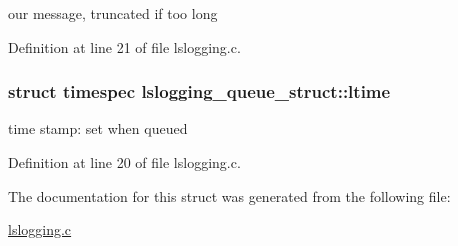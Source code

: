 our message, truncated if too long 

Definition at line 21 of file lslogging.c.\hypertarget{structlslogging__queue__struct_aa8211878c89f3c98757c3433115453eb}{
\subsubsection[{ltime}]{\setlength{\rightskip}{0pt plus 5cm}struct timespec {\bf lslogging\_\-queue\_\-struct::ltime}}}
\label{structlslogging__queue__struct_aa8211878c89f3c98757c3433115453eb}


time stamp: set when queued 

Definition at line 20 of file lslogging.c.

The documentation for this struct was generated from the following file:\begin{DoxyCompactItemize}
\item 
\hyperlink{lslogging_8c}{lslogging.c}\end{DoxyCompactItemize}
